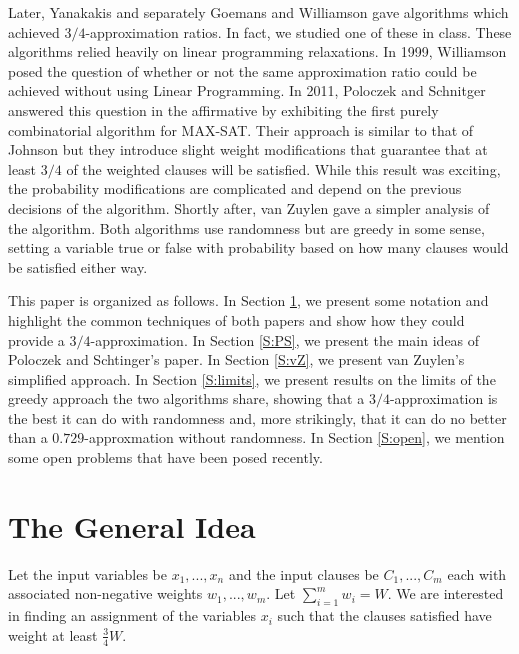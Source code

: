 \documentclass[11pt,letter]{article}
\begin{document}
Later, Yanakakis \cite{Yannakakis1994475} and separately Goemans and Williamson \cite{Goemans94new3/4-approximation}
gave algorithms which achieved $3/4$-approximation ratios. In fact, we studied one of these in class.
These algorithms relied heavily on linear programming relaxations. In 1999, Williamson posed the question
of whether or not the same approximation ratio could be achieved without using Linear Programming. In 2011,
Poloczek and Schnitger \cite{Poloczek:2011:RVJ:2133036.2133087} answered this question in the affirmative
by exhibiting the first purely combinatorial algorithm for MAX-SAT. Their approach is similar to that of Johnson
but they introduce slight weight modifications that guarantee that at least $3/4$ of the weighted clauses will be satisfied.
While this result was exciting, the probability modifications are complicated and depend on the previous decisions
of the algorithm. Shortly after, van Zuylen \cite{vanZuylen:2011:SAM:2238496.2238512} gave a simpler analysis of the algorithm.
Both algorithms use randomness but are greedy in some sense,
setting a variable true or false with probability based on
how many clauses would be satisfied either way.

This paper is organized as follows.
In Section \ref{S:idea}, we present some notation and highlight the common techniques of both papers
and show how they could provide a $3/4$-approximation.
In Section \ref{S:PS}, we present the main ideas of Poloczek and Schtinger's paper.
In Section \ref{S:vZ}, we present van Zuylen's simplified approach.
In Section \ref{S:limits}, we present results on the limits of
the greedy approach the two algorithms share,
showing that a $3/4$-approximation is the best it can do with randomness
and, more strikingly,
that it can do no better than a $0.729$-approxmation without randomness.
In Section \ref{S:open}, we mention some open problems that have been posed recently.

\section{The General Idea}\label{S:idea}

Let the input variables be $x_1,...,x_n$ and the input clauses be $C_1,...,C_m$
each with associated non-negative weights $w_1,...,w_m$. Let $\sum_{i=1}^{m} w_i = W$.
We are interested in finding an assignment of the variables $x_i$ such that the clauses satisfied have weight at least $\frac{3}{4}W$.
\end{document}

